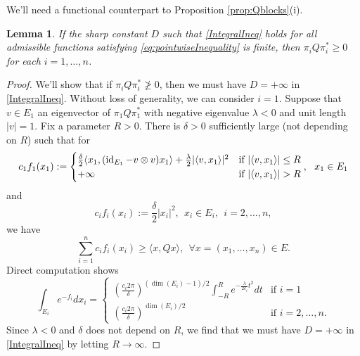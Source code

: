 \documentclass[10pt]{article}
\newtheorem{lemma}[theorem]{Lemma}
\newcommand{\id}{\operatorname{id}}
\begin{document}
We'll need a functional counterpart to Proposition \ref{prop:Qblocks}(i).
\begin{lemma}\label{lem:PropertiesDFunc} If the sharp constant $D$ such that \eqref{IntegralIneq} holds for all admissible functions satisfying \eqref{eq:pointwiseInequality} is finite,  then $\pi_i Q \pi^*_i \geq 0$ for each $i=1,\dots, n$.  
\end{lemma}
\begin{proof}
We'll show that if $\pi_i Q \pi_i^*\not\geq 0$, then  we must have $D =+\infty$ in \eqref{IntegralIneq}.  Without loss of generality, we can consider  $i=1$.  
Suppose   that $v \in E_1$ an eigenvector of $\pi_1 Q \pi_1^*$ with negative eigenvalue $\lambda<0$ and unit length $|v|=1$.  Fix a parameter $R>0$. There is $\delta>0$ sufficiently large (not depending on $R$) such that for
$$
c_1 f_1(x_1) := \begin{cases}
\frac{\delta}{2} \langle x_1, (\id_{E_1} - v\otimes v ) x_1 \rangle + \frac{\lambda}{2} | \langle  v ,  x_1\rangle  |^2 & \mbox{if $ |  \langle  v ,  x_1\rangle | \leq R$}\\
+ \infty & \mbox{if $ | \langle  v ,  x_1\rangle  | > R$}
\end{cases},  ~~x_1\in E_1
$$
and 
$$
c_i f_i(x_i) := \frac{\delta}{2} | x_i|^2 ,  ~~x_i\in E_i, ~~i=2,\dots, n,
$$
we have 
$$
\sum_{i=1}^n c_i f_i(x_i) \geq \langle x, Q x\rangle, ~~\forall x=(x_1, \dots, x_n)\in E. 
$$
 Direct computation shows 
$$
\int_{E_i} e^{-f_i}dx_i = \begin{cases}
\left( \frac{c_i 2 \pi}{\delta}\right)^{(\dim(E_i)-1)/2}  \int_{-R}^R e^{-\frac{\lambda}{2 c_i} t^2} dt & \mbox{if $i=1$}\\
\left( \frac{c_i 2 \pi}{\delta}\right)^{\dim(E_i)/2} & \mbox{if $i=2,\dots, n$.}
\end{cases}
$$
Since $\lambda < 0$ and $\delta$ does not depend on $R$, we find that we must have $D =+\infty$ in \eqref{IntegralIneq} by letting $R\to \infty$.  
\end{proof}
\end{document}
